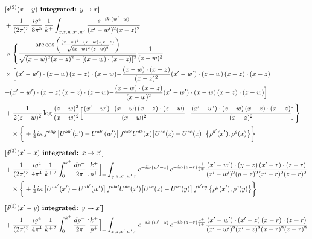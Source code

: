 \documentclass[10pt]{article}
\numberwithin{equation}{section}
\begin{document}
\begin{align}
&\textbf{[$\delta^{(2)}(x-y)$ integrated: $y\to x$]}\notag\\
&+\frac{1}{(2\pi)^{3}}\,\frac{ig^{4}}{8\pi^{5}}\,\frac{1}{k^{+}}\int_{x,z,w,x^{\prime},w^{\prime}}\frac{e^{-ik\cdot(w^{\prime}-w)}}{(x^{\prime}-w^{\prime})^{2}(x-z)^{2}}\notag\\
&\times\Bigg\{\frac{\mathrm{arc\,cos}\left(\frac{(x-w)^{2}-(x-w)\cdot (x-z)}{\sqrt{(x-w)^{2}\,(z-w)^{2}}}\right)}{\sqrt{(x-w)^{2}(x-z)^{2}-[(x-w)\cdot(x-z)]^{2}}}\frac{1}{(z-w)^{2}}\notag\\
&\times\Big[{(x^{\prime}-w^{\prime})\cdot(z-w)\,(x-z)\cdot(x-w)}{-\frac{(x-w)\cdot(x-z)}{(x-z)^{2}}(x^{\prime}-w^{\prime})\cdot(z-w)\,(x-z)\cdot(x-z)}\notag\\
&{+(x^{\prime}-w^{\prime})\cdot(x-z)\,(x-z)\cdot(z-w)}{-\frac{(x-w)\cdot(x-z)}{(x-w)^{2}}(x^{\prime}-w^{\prime})\cdot(x-w)\,(x-z)\cdot(z-w)}\Big]\notag\\
&+\frac{1}{2(z-w)^{2}}\log\frac{(z-w)^{2}}{(x-w)^{2}}\Big[{\frac{(x^{\prime}-w^{\prime})\cdot(x-w)\,(x-z)\cdot(z-w)}{(x-w)^{2}}}{-\frac{(x^{\prime}-w^{\prime})\cdot(z-w)\,(x-z)\cdot(x-z)}{(x-z)^{2}}}\Big]\Bigg\}\notag\\
&\quad\times\bigg\{+\tfrac14 i\kappa\,f^{ebg}\,\big[U^{ab^{\prime}}(x^{\prime})-U^{ab^{\prime}}(w^{\prime})\big]\,f^{adc}U^{db}(x)\big[U^{ce}(z)-U^{ce}(x)\big]\,\big\{\rho^{b^{\prime}}(x^{\prime}),\rho^{g}(x)\big\}\bigg\}\notag\\[6pt]
&\textbf{[$\delta^{(2)}(x^{\prime}-x)$ integrated: $x\to x^{\prime}$]}\notag\\
&+\frac{1}{(2\pi)^{3}}\,\frac{ig^{4}}{4\pi^{4}}\,\frac{1}{k^{+\,2}}\int_{0}^{k^{+}}\frac{dp^{+}}{2\pi}\Big[\frac{k^{+}}{p^{+}}\Big]_{+}\int_{y,z,x^{\prime},w^{\prime},r}e^{-ik\cdot(w^{\prime}-z)}\,e^{-ik\cdot(z-r)\frac{p^{+}}{k^{+}}}\frac{(x^{\prime}-w^{\prime})\cdot(y-z)\,(x^{\prime}-r)\cdot(z-r)}{(x^{\prime}-w^{\prime})^{2}(y-z)^{2}(x^{\prime}-r)^{2}(z-r)^{2}}\notag\\
&\quad\times\bigg\{+\tfrac14 i\kappa\,\big[U^{ab^{\prime}}(x^{\prime})-U^{ab^{\prime}}(w^{\prime})\big]\,f^{abd}U^{de}(x^{\prime})\big[U^{bc}(z)-U^{bc}(y)\big]\,f^{b^{\prime}eg}\,\big\{\rho^{g}(x^{\prime}),\rho^{c}(y)\big\}\bigg\}\notag\\[6pt]
&\textbf{[$\delta^{(2)}(x^{\prime}-y)$ integrated: $y\to x^{\prime}$]}\notag\\
&+\frac{1}{(2\pi)^{3}}\,\frac{ig^{4}}{4\pi^{4}}\,\frac{1}{k^{+\,2}}\int_{0}^{k^{+}}\frac{dp^{+}}{2\pi}\Big[\frac{k^{+}}{p^{+}}\Big]_{+}\int_{x,z,x^{\prime},w^{\prime},r}e^{-ik\cdot(w^{\prime}-z)}\,e^{-ik\cdot(z-r)\frac{p^{+}}{k^{+}}}\frac{(x^{\prime}-w^{\prime})\cdot(x^{\prime}-z)\,(x-r)\cdot(z-r)}{(x^{\prime}-w^{\prime})^{2}(x^{\prime}-z)^{2}(x-r)^{2}(z-r)^{2}}\notag\\

\end{align}
\end{document}
